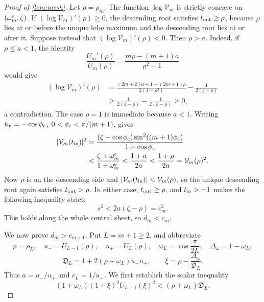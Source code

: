 \documentclass[review,hidelinks,onefignum,onetabnum]{siamart251216}
\begin{document}
\begin{proof}[Proof of \cref{lem:mesh}]
Let \(\rho=\rho_m\).  The function \(\log\mathcal V_m\) is strictly
concave on \((\omega_m^{\rm e},\zeta)\).  If
\((\log\mathcal V_m)'(\rho)\geq0\), the descending root
satisfies \(t_{\rm out}\geq\rho\), because \(\rho\) lies at or before the unique
lobe maximum and the descending root lies at or after it.  Suppose instead that
\((\log\mathcal V_m)'(\rho)<0\).  Then \(\rho>a\).  Indeed, if
\(\rho\leq a<1\), the identity
\[
 \frac{U_m'(\rho)}{U_m(\rho)}
 =\frac{m\rho-(m+1)a}{\rho^2-1}
\]
would give
\[
\begin{aligned}
 (\log\mathcal V_m)'(\rho)
 &=\frac{(2m+2)a+1-(2m+1)\rho}{2(1-\rho^2)}
   -\frac1{2(\zeta-\rho)}\\
 &\geq\frac1{2(1-\rho)}-\frac1{2(\zeta-\rho)}\geq0,
\end{aligned}
\]
a contradiction.  The case \(\rho=1\) is immediate because \(a<1\).
Writing \(t_{\rm in}=-\cos\phi_{\rm c}\),
\(0<\phi_{\rm c}<\pi/(m+1)\), gives
\[
\begin{aligned}
 |\mathcal V_m(t_{\rm in})|^2
 &=\frac{(\zeta+\cos\phi_{\rm c})
          \sin^2((m+1)\phi_{\rm c})}{1+\cos\phi_{\rm c}}\\
 &<\frac{\zeta+\omega_m^{\rm e}}{1+\omega_m^{\rm e}}
 <\frac{1+a}{2a}<\frac{1+\rho}{2a}=\mathcal V_m(\rho)^2.
\end{aligned}
\]
Now \(\rho\) is on the descending side and
\(|\mathcal V_m(t_{\rm in})|<\mathcal V_m(\rho)\), so the
unique descending root again satisfies \(t_{\rm out}>\rho\).  In either case,
\(t_{\rm out}\geq\rho\), and \(t_{\rm in}>-1\) makes the following
inequality strict:
\[
 s^2<2a(\zeta-\rho)=c_m^2.
\]
This holds along the whole central sheet, so \(d_m<c_m\).

We now prove \(d_m>c_{m+1}\).  Put \(L=m+1\geq2\), and abbreviate
\[
 \rho=\rho_L,\quad u_-=U_{L-1}(\rho),\quad u_+=U_L(\rho),\quad
 \omega_L=\cos\frac{\pi}{2L},\quad \Delta_\omega=1-\omega_L,
\]
\begin{equation}\label{eq:central-D-xi}
 \mathfrak D_L=1+2(\rho+\omega_L)u_-u_+,\qquad
 \xi=\rho-\frac{\Delta_\omega}{\mathfrak D_L}.
\end{equation}
Thus \(a=u_-/u_+\) and \(c_L=1/u_+\).  We first establish the scalar
inequality
\begin{equation}\label{eq:central-target}
 (1+\omega_L)(1+\xi)^2U_{L-1}(\xi)^2
 <(\rho+\omega_L)\mathfrak D_L.
\end{equation}


\end{proof}
\end{document}

